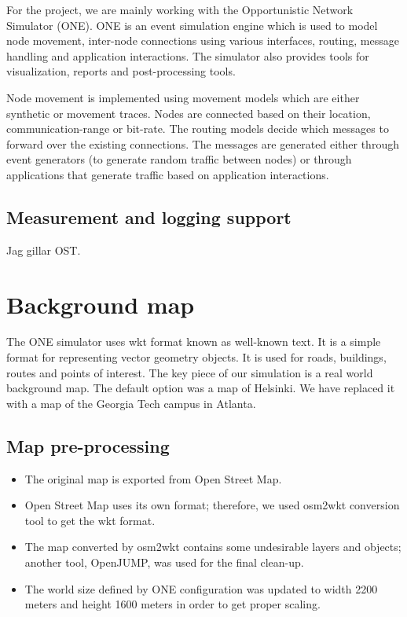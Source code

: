 \documentclass[conference]{IEEEtran}
\begin{document}
For the project, we are mainly working with the Opportunistic Network Simulator (ONE). ONE is an event simulation engine which is used to model node movement, inter-node connections using various interfaces, routing, message handling and application interactions. The simulator also provides tools for visualization, reports and post-processing tools.

Node movement is implemented using movement models which are either synthetic or movement traces. Nodes are connected based on their location, communication-range or bit-rate. The routing models decide which messages to forward over the existing connections. The messages are generated either through event generators (to generate random traffic between nodes) or through applications that generate traffic based on application interactions.

\subsection{Measurement and logging support}

Jag gillar OST.

\section{Background map}

The ONE simulator uses wkt format known as well-known text. It is a simple format for representing vector geometry objects. It is used for roads, buildings, routes and points of interest. The key piece of our simulation is a real world background map. The default option was a map of Helsinki. We have replaced it with a map of the Georgia Tech campus in Atlanta.

\subsection{Map pre-processing}

\begin{itemize}
  \item The original map is exported from Open Street Map.
  \item Open Street Map uses its own format; therefore, we used osm2wkt conversion tool to get the wkt format.
  \item The map converted by osm2wkt contains some undesirable layers and objects; another tool, OpenJUMP, was used for the final clean-up.
  \item The world size defined by ONE configuration was updated to width 2200 meters and height 1600 meters in order to get proper scaling.
\end{itemize}
\end{document}
